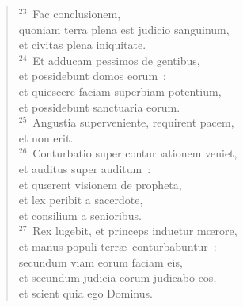 \begin{verse}
${}^{23}$~Fac conclusionem,\\ quoniam terra plena est judicio sanguinum,\\ et civitas plena iniquitate.\\
${}^{24}$~Et adducam pessimos de gentibus,\\ et possidebunt domos eorum~:\\ et quiescere faciam superbiam potentium,\\ et possidebunt sanctuaria eorum.\\
${}^{25}$~Angustia superveniente, requirent pacem,\\ et non erit.\\
${}^{26}$~Conturbatio super conturbationem veniet,\\ et auditus super auditum~:\\ et qu\ae rent visionem de propheta,\\ et lex peribit a sacerdote,\\ et consilium a senioribus.\\
${}^{27}$~Rex lugebit, et princeps induetur mœrore,\\ et manus populi terr\ae\ conturbabuntur~:\\ secundum viam eorum faciam eis,\\ et secundum judicia eorum judicabo eos,\\ et scient quia ego Dominus.\end{verse}



